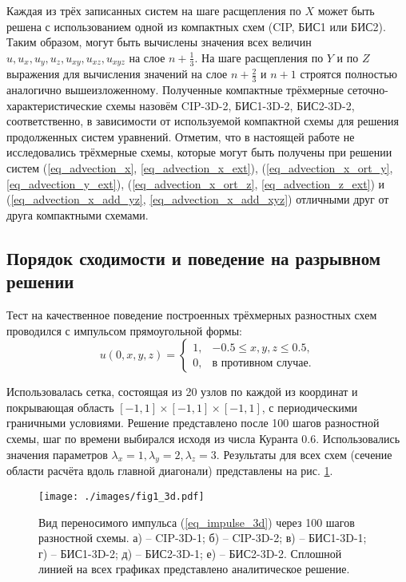 \documentclass[11pt]{article}
\begin{document}
Каждая из трёх записанных систем на шаге расщепления по $X$ может быть решена с использованием одной из компактных схем (CIP, БИС1 или БИС2).
Таким образом, могут быть вычислены значения всех величин $u, u_x, u_y, u_z, u_{xy}, u_{xz}, u_{xyz}$ на слое $n + \frac{1}{3}$.
На шаге расщепления по $Y$ и по $Z$ выражения для вычисления значений на слое $n + \frac{2}{3}$ и $n + 1$ строятся полностью аналогично вышеизложенному.
Полученные компактные трёхмерные сеточно-характеристические схемы назовём CIP-3D-2, БИС1-3D-2, БИС2-3D-2, соответственно, в зависимости от используемой компактной схемы для решения продолженных систем уравнений.
Отметим, что в настоящей работе не исследовались трёхмерные схемы, которые могут быть получены при решении систем (\ref{eq_advection_x}, \ref{eq_advection_x_ext}),  (\ref{eq_advection_x_ort_y}, \ref{eq_advection_y_ext}), (\ref{eq_advection_x_ort_z}, \ref{eq_advection_z_ext}) и (\ref{eq_advection_x_add_yz}, \ref{eq_advection_x_add_xyz}) отличными друг от друга компактными схемами.

\subsection{Порядок сходимости и поведение на разрывном решении}

Тест на качественное поведение построенных трёхмерных разностных схем проводился с импульсом прямоугольной формы:
\begin{equation}
\label{eq_impulse_3d}
u(0, x, y, z) = 
\begin{cases}
1, & -0.5 \le x, y, z \le 0.5, \\
0, & \mbox{в противном случае}.
\end{cases}
\end{equation}

Использовалась сетка, состоящая из 20 узлов по каждой из координат и покрывающая область $[-1,1]\times[-1,1]\times[-1,1]$, с периодическими граничными условиями.
Решение представлено после 100 шагов разностной схемы, шаг по времени выбирался исходя из числа Куранта $0.6$.
Использовались значения параметров $\lambda_x = 1, \lambda_y = 2, \lambda_z = 3$.
Результаты для всех схем (сечение области расчёта вдоль главной диагонали) представлены на рис. \ref{img_impulse_3d}.

\begin{figure}[!h]
\begin{center}
\texttt{[image: ./images/fig1\_3d.pdf]}
\caption{
Вид переносимого импульса (\ref{eq_impulse_3d}) через 100 шагов разностной схемы.
а) -- CIP-3D-1; б) -- CIP-3D-2; в) -- БИС1-3D-1; г) -- БИС1-3D-2; д) -- БИС2-3D-1; е) -- БИС2-3D-2.
Сплошной линией на всех графиках представлено аналитическое решение.
}
\label{img_impulse_3d}
\end{center}
\end{figure}
\end{document}
